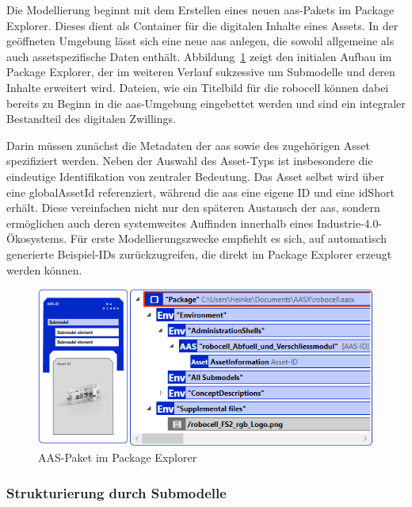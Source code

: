 Die Modellierung beginnt mit dem Erstellen eines neuen \acs{aas}-Pakets im Package Explorer.
Dieses dient als Container für die digitalen Inhalte eines Assets.  
In der geöffneten Umgebung lässt sich eine neue \acs{aas} anlegen, die sowohl allgemeine als auch assetspezifische Daten enthält. 
Abbildung~\ref{fig:NeuesAASPaket} zeigt den initialen Aufbau im Package Explorer, der im weiteren Verlauf sukzessive um Submodelle und deren Inhalte erweitert wird.
Dateien, wie ein Titelbild für die robocell können dabei bereits zu Beginn in die \acs{aas}-Umgebung eingebettet werden und sind ein integraler Bestandteil des digitalen Zwillings.

Darin müssen zunächst die Metadaten der \acs{aas} sowie des zugehörigen Asset spezifiziert werden.
Neben der Auswahl des Asset-Typs ist insbesondere die eindeutige Identifikation von zentraler Bedeutung.
Das Asset selbst wird über eine globalAssetId referenziert, während die \acs{aas} eine eigene ID und eine idShort erhält.
Diese vereinfachen nicht nur den späteren Austausch der \acs{aas}, sondern ermöglichen auch deren systemweites Auffinden innerhalb eines Industrie-4.0-Ökosystems.
Für erste Modellierungszwecke empfiehlt es sich, auf automatisch generierte Beispiel-IDs zurückzugreifen, die direkt im Package Explorer erzeugt werden können.

\begin{figure}[htbp]
    \centering
    \includegraphics{Bilder/ModellierungAAS/Final/NeuesAASPaket.PNG}
    \caption{AAS-Paket im Package Explorer}
    \label{fig:NeuesAASPaket}
\end{figure}


\subsubsection*{Strukturierung durch Submodelle}
\vspace{-0.5em}

